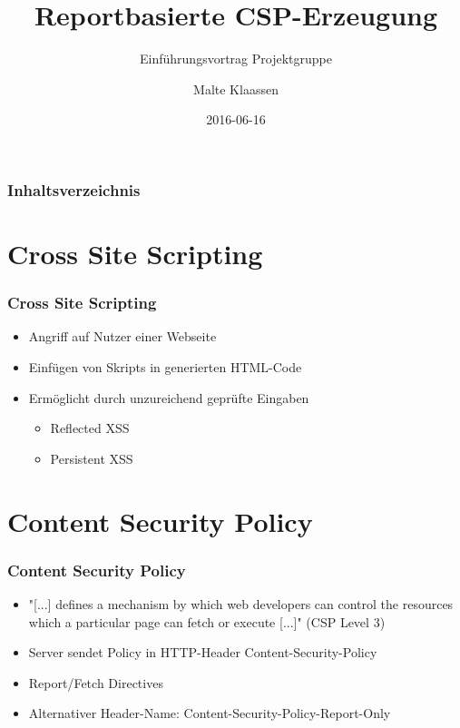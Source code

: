 \documentclass[handout]{beamer}
\title[Reportbasierte CSP Erzeugung]{Reportbasierte CSP-Erzeugung}
\subtitle{Einführungsvortrag Projektgruppe}
\author[Klaassen]{Malte Klaassen}
\date{2016-06-16}
\begin{document}
\begin{frame}%
\titlepage
\end{frame}

\begin{frame}%
	\frametitle{Inhaltsverzeichnis}
	\tableofcontents%
\end{frame}

\section{Cross Site Scripting}
\begin{frame}[c]
\frametitle{Cross Site Scripting}
\begin{itemize}
\item Angriff auf Nutzer einer Webseite
\item Einfügen von Skripts in generierten HTML-Code
\item Ermöglicht durch unzureichend geprüfte Eingaben
\begin{itemize}
\item Reflected XSS
\item Persistent XSS
\end{itemize}
\end{itemize}
\end{frame}

\section{Content Security Policy}
\begin{frame}[c]
\frametitle{Content Security Policy}
\begin{itemize}
\item "[...] defines a mechanism by which web developers can control the resources which a particular page can fetch or execute [...]" (CSP Level 3)
\item Server sendet Policy in HTTP-Header Content-Security-Policy
\item Report/Fetch Directives
\item Alternativer Header-Name: Content-Security-Policy-Report-Only
\end{itemize}
\end{frame}
\end{document}
